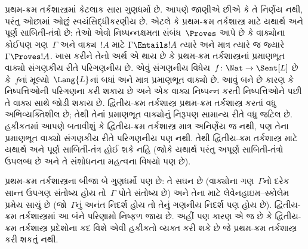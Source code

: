 \label{guunit:OLP-0331}


પ્રથમ-ક્રમ તર્કશાસ્ત્રમાં કેટલાક સારા ગુણધર્મો છે. આપણે જાણીએ છીએ કે
તે નિર્ણેય નથી, પરંતુ ઓછામાં ઓછું સ્વયંસિદ્ધીકરણીય છે. એટલે કે
પ્રથમ-ક્રમ તર્કશાસ્ત્ર માટે યથાર્થ અને પૂર્ણ સાબિતી-તંત્રો છે: તેઓ
એવો નિષ્પન્નક્ષમતા સંબંધ~$\Proves$ આપે છે કે વાક્યોના કોઈપણ
ગણ~$\Gamma$ અને વાક્ય~$!A$ માટે $\Gamma \Entails !A$ ત્યારે અને માત્ર
ત્યારે જ જ્યારે $\Gamma \Proves !A$. ખાસ કરીને તેનો અર્થ એ થાય છે કે
પ્રથમ-ક્રમ તર્કશાસ્ત્રનાં પ્રમાણભૂત વાક્યો સંગણકીય રીતે પરિગણનીય છે. એવું સંગણનીય વિધેય~$f\colon \Nat \to
\Sent[L]$ છે કે~$f$નાં મૂલ્યો~$\Lang{L}$નાં બધાં અને માત્ર પ્રમાણભૂત
વાક્યો છે. આવું બને છે કારણ કે નિષ્પત્તિઓની પરિગણના
કરી શકાય છે અને એક વાક્ય નિષ્પન્ન કરતી નિષ્પત્તિઓને પછી
તે વાક્ય સાથે જોડી શકાય છે. દ્વિતીય-ક્રમ તર્કશાસ્ત્ર
પ્રથમ-ક્રમ તર્કશાસ્ત્ર કરતાં વધુ અભિવ્યક્તિશીલ છે; તેથી તેનાં
પ્રમાણભૂત વાક્યોનું નિરૂપણ સામાન્ય રીતે વધુ જટિલ છે. હકીકતમાં આપણે
બતાવીશું કે દ્વિતીય-ક્રમ તર્કશાસ્ત્ર માત્ર અનિર્ણેય જ નથી, પણ તેના
પ્રમાણભૂત વાક્યો સંગણકીય રીતે પરિગણનીય પણ નથી. તેથી દ્વિતીય-ક્રમ તર્કશાસ્ત્ર માટે યથાર્થ અને
પૂર્ણ સાબિતી-તંત્ર હોઈ શકે નહિ (જોકે યથાર્થ પરંતુ અપૂર્ણ સાબિતી-તંત્રો
ઉપલબ્ધ છે અને તે સંશોધનના મહત્વના વિષયો પણ છે).

પ્રથમ-ક્રમ તર્કશાસ્ત્રના બીજા બે ગુણધર્મો પણ છે: તે સઘન છે (વાક્યોના
ગણ~$\Gamma$નો દરેક સાન્ત ઉપગણ સંતોષ્ય હોય તો~$\Gamma$ પોતે સંતોષ્ય
છે) અને તેના માટે લેવેનહાઇમ--સ્કોલેમ પ્રમેય સાચું છે (જો~$\Gamma$નું
અનંત નિદર્શ હોય તો તેનું ગણનીય નિદર્શ પણ હોય છે).
દ્વિતીય-ક્રમ તર્કશાસ્ત્રમાં આ બંને પરિણામો નિષ્ફળ જાય છે. અહીં પણ
કારણ એ જ છે કે દ્વિતીય-ક્રમ તર્કશાસ્ત્ર પ્રદેશોના કદ વિશે એવી
હકીકતો વ્યક્ત કરી શકે છે જે પ્રથમ-ક્રમ તર્કશાસ્ત્ર કરી શકતું નથી.
\endgroup


\begingroup
\makeatletter{}\makeatother


\label{guunit:OLP-0332}


